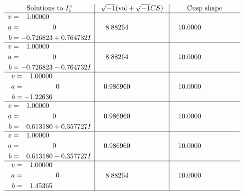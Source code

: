 \documentclass[1p]{elsarticle_modified}
\theoremstyle{definition}
\newcommand{\I}{\sqrt{-1}}
\begin{document}
$$\begin{array}{c|c|c}  
\text{Solutions to }I^v_{1}& \I (\text{vol} + \sqrt{-1}CS) & \text{Cusp shape}\\
 \hline 
\begin{aligned}
v &= \phantom{-}1.00000\phantom{ +0.000000I} \\
a &= \phantom{-0.000000 } 0 \\
b &= -0.726823 + 0.764732 I\end{aligned}
 & \phantom{-}8.88264\phantom{ +0.000000I} & \phantom{-}10.0000\phantom{ +0.000000I} \\ \hline\begin{aligned}
v &= \phantom{-}1.00000\phantom{ +0.000000I} \\
a &= \phantom{-0.000000 } 0 \\
b &= -0.726823 - 0.764732 I\end{aligned}
 & \phantom{-}8.88264\phantom{ +0.000000I} & \phantom{-}10.0000\phantom{ +0.000000I} \\ \hline\begin{aligned}
v &= \phantom{-}1.00000\phantom{ +0.000000I} \\
a &= \phantom{-0.000000 } 0 \\
b &= -1.22636\phantom{ +0.000000I}\end{aligned}
 & \phantom{-}0.986960\phantom{ +0.000000I} & \phantom{-}10.0000\phantom{ +0.000000I} \\ \hline\begin{aligned}
v &= \phantom{-}1.00000\phantom{ +0.000000I} \\
a &= \phantom{-0.000000 } 0 \\
b &= \phantom{-}0.613180 + 0.357727 I\end{aligned}
 & \phantom{-}0.986960\phantom{ +0.000000I} & \phantom{-}10.0000\phantom{ +0.000000I} \\ \hline\begin{aligned}
v &= \phantom{-}1.00000\phantom{ +0.000000I} \\
a &= \phantom{-0.000000 } 0 \\
b &= \phantom{-}0.613180 - 0.357727 I\end{aligned}
 & \phantom{-}0.986960\phantom{ +0.000000I} & \phantom{-}10.0000\phantom{ +0.000000I} \\ \hline\begin{aligned}
v &= \phantom{-}1.00000\phantom{ +0.000000I} \\
a &= \phantom{-0.000000 } 0 \\
b &= \phantom{-}1.45365\phantom{ +0.000000I}\end{aligned}
 & \phantom{-}8.88264\phantom{ +0.000000I} & \phantom{-}10.0000\phantom{ +0.000000I}\\
 \hline 
 \end{array}$$\newpage\newpage\renewcommand{\arraystretch}{1}
\end{document}
